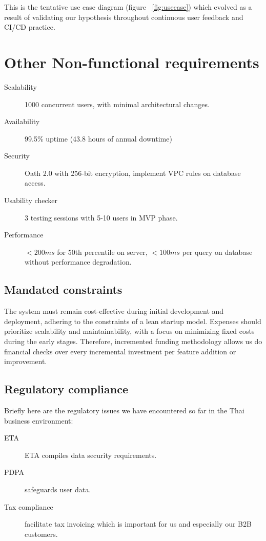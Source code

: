 
This is the tentative use case diagram (figure ~\ref{fig:usecase}) which evolved as a result of validating our hypothesis throughout continuous user feedback and CI/CD practice.

\section{Other Non-functional requirements}

\begin{description}
	\item[Scalability] 1000 concurrent users, with minimal architectural changes.
	\item[Availability] 99.5\% uptime (43.8 hours of annual downtime)
	\item[Security] Oath 2.0 with 256-bit encryption, implement VPC rules on database access.
	\item[Usability checker] 3 testing sessions with 5-10 users in MVP phase.
	\item[Performance] $< 200 ms$ for 50th percentile on server, $< 100 ms$ per query on database without performance degradation.
\end{description}

\subsection{Mandated constraints}

 The system must remain cost-effective during initial development and deployment, adhering to the constraints of a lean startup model. Expenses should prioritize scalability and maintainability, with a focus on minimizing fixed costs during the early stages. Therefore, incremented funding methodology allows us do financial checks over every incremental investment per feature addition or improvement.

\subsection{Regulatory compliance}

Briefly here are the regulatory issues we have encountered so far in the Thai business environment:

\begin{description}
	\item[ETA] ETA compiles data security requirements.
	\item[PDPA] safeguards user data.
	\item[Tax compliance] facilitate tax invoicing which is important for us and especially our B2B customers.
\end{description}

